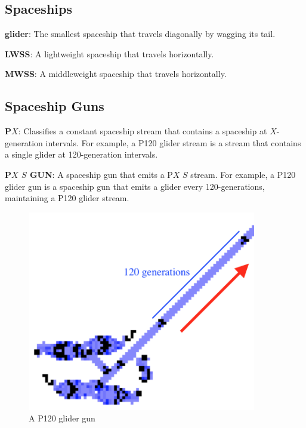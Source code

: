 \documentclass{article}
\begin{document}
\subsection{Spaceships}
\noindent\textbf{glider}: The smallest spaceship that travels diagonally by wagging its tail.

\vspace{1em}

\noindent\textbf{LWSS}: A lightweight spaceship that travels horizontally.

\vspace{1em}

\noindent\textbf{MWSS}: A middleweight spaceship that travels horizontally.

\vspace{1em}
\subsection{Spaceship Guns}
\noindent\textbf{P$X$}: Classifies a constant spaceship stream that contains a spaceship at $X$-generation intervals. For example, a P120 glider stream is a stream that contains a single glider at 120-generation intervals.

\vspace{1em}

\noindent\textbf{P$X$ $S$ GUN}: A spaceship gun that emits a P$X$ $S$ stream. For example, a P120 glider gun is a spaceship gun that emits a glider every 120-generations, maintaining a P120 glider stream.

\vspace{1em}

\begin{figure}[h]
\centering
\includegraphics[width=10cm,keepaspectratio]{images/P120-GUN.png}
\captionsetup{labelformat=empty} \caption{A P120 glider gun}
\end{figure}
\end{document}
